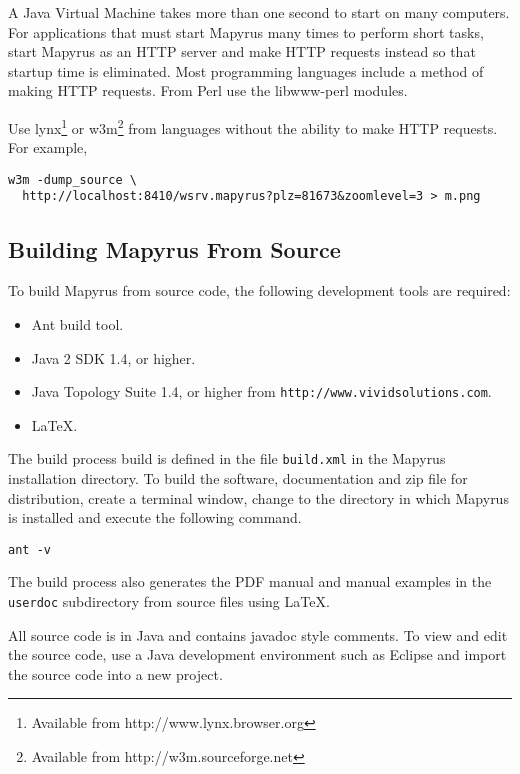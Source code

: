 A Java Virtual Machine takes more than one second to start on many computers.
For applications that must start Mapyrus many times to perform short tasks,
start Mapyrus as an HTTP server and make HTTP requests instead so that
startup time is eliminated.
Most programming languages include a method of making HTTP requests.
From Perl use the libwww-perl modules.

Use lynx\footnote{Available from http://www.lynx.browser.org} or
w3m\footnote{Available from http://w3m.sourceforge.net}
from languages without the ability to make
HTTP requests.  For example,

\begin{verbatim}
w3m -dump_source \
  http://localhost:8410/wsrv.mapyrus?plz=81673&zoomlevel=3 > m.png
\end{verbatim}

\subsection{Building Mapyrus From Source}

To build Mapyrus from source code, the following development tools
are required:

\begin{itemize}
\item
Ant build tool.
\item
Java 2 SDK 1.4, or higher.
\item
Java Topology Suite 1.4, or higher from \texttt{http://www.vividsolutions.com}.
\item
\LaTeX.
\end{itemize}

The build process build is defined in the file \texttt{build.xml} in the
Mapyrus installation directory.  To build the software, documentation and zip
file for distribution, create a terminal window, change to the directory in
which Mapyrus is installed and execute the following command.

\begin{verbatim}
ant -v
\end{verbatim}

The build process also generates the PDF manual and manual examples in the
\texttt{userdoc} subdirectory from source files using \LaTeX.

All source code is in Java and contains javadoc style comments.  To view and
edit the source code, use a Java development environment such as Eclipse and
import the source code into a new project.


